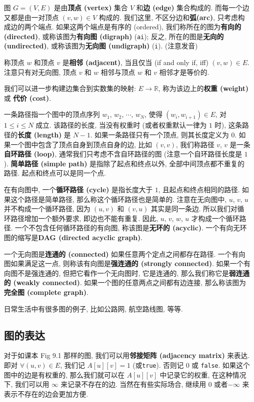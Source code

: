\documentclass[a4paper]{ctexart}
\theoremstyle{definition}
\theoremstyle{definition}
\begin{document}
 图 $G = (V, E)$ 是由{\bf 顶点 (vertex)} 集合
$V$ 和{\bf 边 (edge)} 集合构成的. 而每一个边又都是由一对顶点 $(v, w) \in V$ 构成的.
我们这里, 不区分边和{\bf 弧(arc)}, 只考虑构成边的两个端点.
如果这两个端点是有序的 (ordered), 我们称所在的图为{\bf 有向的 (directed)},
或称该图为{\bf 有向图 (digraph)} (\verb|ai|); 反之, 所在的图是{\bf 无向的 (undirected)},
或称该图为{\bf 无向图 (undigraph)} (\verb|i|). (注意发音)

称顶点 $w$ 和顶点 $v$ 是{\bf 相邻 (adjacent)}, 当且仅当 (if and only if, iff)
$(v, w) \in E$. 注意只有对无向图, 顶点 $v$ 和 $w$ 相邻与顶点 $w$ 和 $v$ 相邻才是等价的.

我们可以进一步构建边集合到实数集的映射: $E \to \mathbb{R}$, 称为该边上的{\bf 权重 (weight)}
或 {\bf 代价 (cost)}. 

 一条路径指一个图中的顶点序列 $w_1$, $w_2$, $\cdots$,
$w_N$, 使得 $(w_i, w_{i + 1}) \in E$, 对 $1 \leq i \leq N$ 成立.
该路径的长度, 当没有权重时 (或者权重默认一律为 $1$ 时), 这条路径的{\bf 长度 (length)}
是 $N - 1$. 如果一条路径只有一个顶点, 则其长度定义为 $0$.
如果一个图中包含了顶点自身到顶点自身的边, 比如 $(v, v)$,
我们称路径 $v$, $v$ 是一条{\bf 自环路径 (loop)},
通常我们只考虑不含自环路径的图 (注意一个自环路径长度是 $1$). {\bf 简单路径 (simple path)}
是指除了起点和终点以外, 全部中间顶点都不重复的路径. 起点和终点可以是同一个点.

在有向图中, 一个{\bf 循环路径 (cycle)} 是指长度大于 $1$, 且起点和终点相同的路径.
如果这个路径是简单路径, 那么称这个循环路径也是简单的. 注意在无向图中, $u$, $v$, $u$
并不构成一个循环路径, 因为 $(u, v)$ 和 $(v, u)$ 其实是同一条边.
所以我们对循环路径增加一个额外要求, 即边也不能有重复. 因此, $u$, $v$, $w$, $u$
才构成一个循环路径. 一个不包含任何循环路径的有向图,
称该图是{\bf 无环的 (acyclic)}. 一个有向无环图的缩写是{\bf DAG (directed acyclic graph)}.

一个无向图是{\bf 连通的 (connected)} 如果任意两个定点之间都存在路径.
一个有向图如果满足这一点, 则称该有向图是{\bf 强连通的 (strongly connected)}.
如果一个有向图不是强连通的, 但把它看作一个无向图时, 它是连通的,
那么我们称它是{\bf 弱连通的 (weakly connected)}. 如果一个图的任意两点之间都有边连接,
那么称该图为{\bf 完全图 (complete graph)}.

日常生活中有很多图的例子, 比如公路网, 航空路线图, 等等.

\subsection{图的表达}
对于如课本 Fig 9.1 那样的图, 我们可以用{\bf 邻接矩阵 (adjacency matrix)} 来表达.
即对 $\forall (u, v) \in E$, 我们记 $A[u][v] = 1$ (或\verb|true|).
否则记 $0$ 或 \verb|false|. 如果这个图中的边是有权重的, 那么我们就可以在
$A[u][v]$ 中记录它的权重, 在这种情况下, 我们可以用 $\infty$ 来记录不存在的边.
当然在有些实际场合, 继续用 $0$ 或者$-\infty$ 来表示不存在的边会更加方便. 
\end{document}
